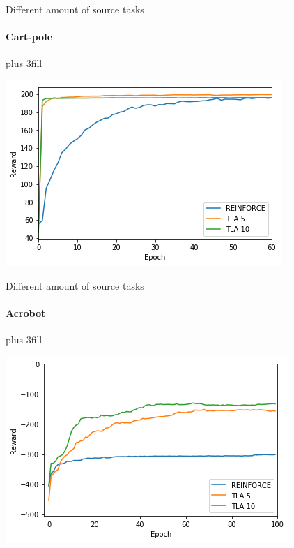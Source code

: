 \documentclass{beamer}
\begin{document}
\begin{frame}[fragile]{Different amount of source tasks}
\framesubtitle{Cart-pole}
\vskip0pt plus 3fill
\begin{center}
    \includegraphics[width=.8\linewidth]{results/CartPole/no_sparse_transfer/reward_target_re-akt5-akt10.png}
\end{center}
\end{frame}

\begin{frame}[fragile]{Different amount of source tasks}
\framesubtitle{Acrobot}
\vskip0pt plus 3fill
\begin{center}
    \includegraphics[width=.8\linewidth]{results/Acrobot/no_sparse_transfer/reward_target_re-akt5-akt10.png}
\end{center}
\end{frame}
\end{document}
